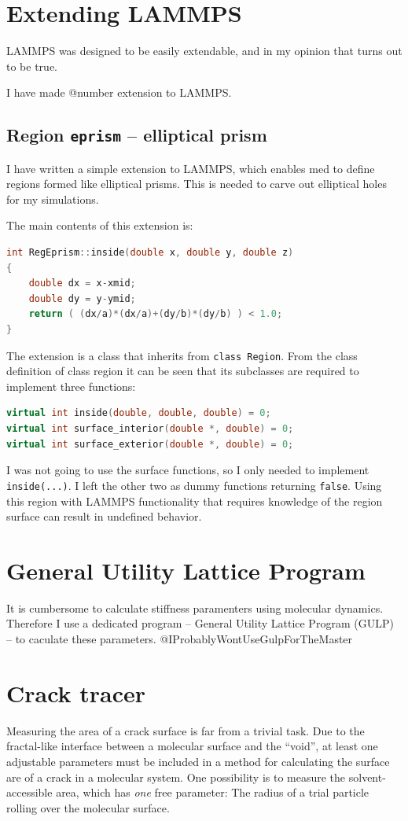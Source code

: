 \section{Extending LAMMPS}
LAMMPS was designed to be easily extendable, and in my opinion that turns out to be true.

I have made @number extension to LAMMPS.

\subsection{Region {\tt eprism} -- elliptical prism}
\label{subsec:reg_eprism}
I have written a simple extension to LAMMPS, which enables med to define regions formed like elliptical prisms. This is needed to carve out elliptical holes for my simulations. 

The main contents of this extension is:

\begin{lstlisting}[language=c++]
int RegEprism::inside(double x, double y, double z) 
{
	double dx = x-xmid;
	double dy = y-ymid;
	return ( (dx/a)*(dx/a)+(dy/b)*(dy/b) ) < 1.0;
}
\end{lstlisting}

The extension is a class that inherits from {\tt class Region}. 
From the class definition of class region it can be seen that its subclasses are required to implement three functions:

\begin{lstlisting}[language=c++]
virtual int inside(double, double, double) = 0;
virtual int surface_interior(double *, double) = 0;
virtual int surface_exterior(double *, double) = 0;
\end{lstlisting}

I was not going to use the surface functions, so I only needed to implement {\tt inside(...)}. I left the other two as dummy functions returning {\tt false}. Using this region with LAMMPS functionality that requires knowledge of the region surface can result in undefined behavior.


\section{General Utility Lattice Program}
It is cumbersome to calculate stiffness paramenters using molecular dynamics. Therefore I use a dedicated program -- General Utility Lattice Program (GULP) -- to caculate these parameters. @IProbablyWontUseGulpForTheMaster

\section{Crack tracer}
Measuring the area of a crack surface is far from a trivial task. Due to the fractal-like interface between a molecular surface and the ``void'', at least one adjustable parameters must be included in a method for calculating the surface are of a crack in a molecular system. One possibility is to measure the solvent-accessible area, which has \emph{one} free parameter: The radius of a trial particle rolling over the molecular surface. 


